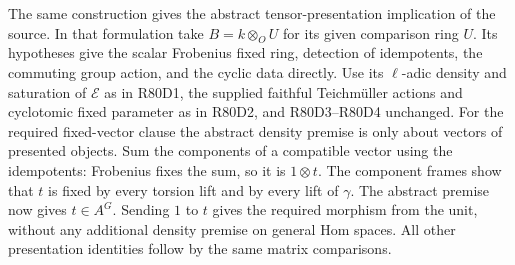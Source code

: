 The same construction gives the abstract tensor-presentation
implication of the source. In that formulation take
$B=k\otimes_O U$ for its given comparison ring $U$. Its hypotheses
give the scalar Frobenius fixed ring, detection of idempotents,
the commuting group action, and the cyclic data directly.
Use its $\ell$-adic density and saturation of $\mathcal E$ as in
R80D1, the supplied faithful Teichm\"uller actions and cyclotomic
fixed parameter as in R80D2, and R80D3--R80D4 unchanged.
For the required fixed-vector clause the abstract density premise
is only about vectors of presented objects. Sum the components of
a compatible vector using the idempotents: Frobenius fixes the
sum, so it is $1\otimes t$. The component frames show that $t$
is fixed by every torsion lift and by every lift of $\gamma$.
The abstract premise now gives $t\in A^G$. Sending $1$ to $t$
gives the required morphism from the unit, without any additional
density premise on general Hom spaces. All other presentation
identities follow by the same matrix comparisons.
